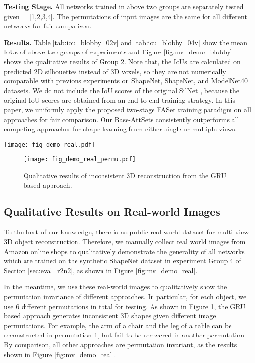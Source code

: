 \documentclass[twocolumn]{svjour3}    \pdfoutput=1
\newcommand{\faset}{FASet}
\begin{document}
\textbf{Testing Stage.} All networks trained in above two groups are separately tested given  = [1,2,3,4]. The permutations of input images are the same for all different networks for fair comparison.

\textbf{Results.} Table \ref{tab:iou_blobby_02v} and \ref{tab:iou_blobby_04v} show the mean IoUs of above two groups of experiments and Figure \ref{fig:mv_demo_blobby} shows the qualitative results of Group 2. Note that, the IoUs are calculated on predicted 2D silhouettes instead of 3D voxels, so they are not numerically comparable with previous experiments on ShapeNet, ShapeNet, and ModelNet40 datasets. We do not include the IoU scores of the original SilNet \citep{Wiles2017}, because the original IoU scores are obtained from an end-to-end training strategy. In this paper, we uniformly apply the proposed two-stage \faset{} training paradigm on all approaches for fair comparison. Our Base-AttSets consistently outperforms all competing approaches for shape learning from either single or multiple views.

\begin{figure*}[t]
\centering
   \texttt{[image: fig\_demo\_real.pdf]}
\caption{Qualitative results of multi-view 3D reconstruction from real-world images.}
\label{fig:mv_demo_real}
\vspace{-0.3cm}
\end{figure*}
\begin{figure}[t]
\centering
   \texttt{[image: fig\_demo\_real\_permu.pdf]}
\caption{Qualitative results of inconsistent 3D reconstruction from the GRU based approach.}
\label{fig:mv_demo_real_permu}
\vspace{-0.3cm}
\end{figure}

\vspace{-0.6cm}
\subsection{Qualitative Results on Real-world Images}
To the best of our knowledge, there is no public real-world dataset for multi-view 3D object reconstruction. Therefore, we manually collect real world images from Amazon online shops to qualitatively demonstrate the generality of all networks which are trained on the synthetic ShapeNet dataset in experiment Group 4 of Section \ref{sec:eval_r2n2}, as shown in Figure \ref{fig:mv_demo_real}.

In the meantime, we use these real-world images to qualitatively show the permutation invariance of different approaches. In particular, for each object, we use 6 different permutations in total for testing. As shown in Figure \ref{fig:mv_demo_real_permu}, the GRU based approach generates inconsistent 3D shapes given different image permutations. For example, the arm of a chair and the leg of a table can be reconstructed in permutation 1, but fail to be recovered in another permutation. By comparison, all other approaches are permutation invariant, as the results shown in Figure \ref{fig:mv_demo_real}.
\end{document}
